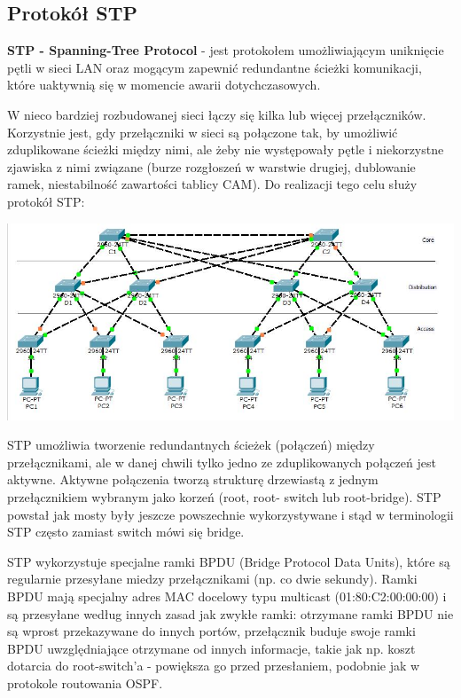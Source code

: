 \documentclass[12pt]{article}
\begin{document}
    \subsection{Protokół STP}
    \textbf{STP - Spanning-Tree Protocol} - jest protokołem umożliwiającym uniknięcie pętli w sieci LAN oraz mogącym zapewnić redundantne ścieżki komunikacji,
    które uaktywnią się w momencie awarii dotychczasowych.

    W nieco bardziej rozbudowanej sieci łączy się kilka lub więcej przełączników. Korzystnie jest,
    gdy przełączniki w sieci są połączone tak, by umożliwić zduplikowane ścieżki między nimi, ale
    żeby nie występowały pętle i niekorzystne zjawiska z nimi związane (burze rozgłoszeń w
    warstwie drugiej, dublowanie ramek, niestabilność zawartości tablicy CAM). Do realizacji
    tego celu służy protokół STP:

    \bigskip
    \includegraphics[width=\linewidth]{stp.png}
    \smallskip

    STP umożliwia tworzenie redundantnych ścieżek (połączeń) między przełącznikami, ale w
    danej chwili tylko jedno ze zduplikowanych połączeń jest aktywne. Aktywne połączenia
    tworzą strukturę drzewiastą z jednym przełącznikiem wybranym jako korzeń (root, root- switch lub root-bridge).
    STP powstał jak mosty były jeszcze powszechnie wykorzystywane i stąd w terminologii STP często zamiast switch mówi się bridge.

    STP wykorzystuje specjalne ramki BPDU (Bridge Protocol Data Units), które są regularnie
    przesyłane miedzy przełącznikami (np. co dwie sekundy). Ramki BPDU mają specjalny adres
    MAC docelowy typu multicast (01:80:C2:00:00:00) i są przesyłane według innych zasad jak
    zwykłe ramki: otrzymane ramki BPDU nie są wprost przekazywane do innych portów,
    przełącznik buduje swoje ramki BPDU uwzględniające otrzymane od innych informacje,
    takie jak np. koszt dotarcia do root-switch'a - powiększa go przed przesłaniem,
    podobnie jak w protokole routowania OSPF. \\
\end{document}
